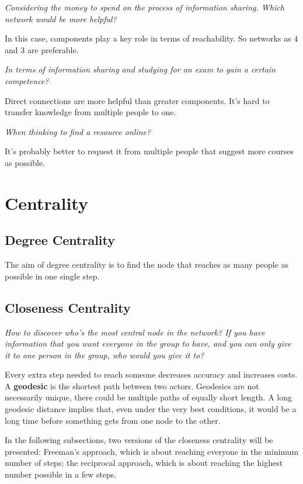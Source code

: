 \documentclass[
  notitlepage,
  onecolumn,
  openany]{book}
\begin{document}
\emph{Considering the money to spend on the process of information sharing. Which network would be more helpful?}

In this case, components play a key role in terms of reachability. So networks as \(4\) and \(3\) are preferable.

\emph{In terms of information sharing and studying for an exam to gain a certain competence?}

Direct connections are more helpful than greater components. It's hard to transfer knowledge from multiple people to one.

\emph{When thinking to find a resource online?}

It's probably better to request it from multiple people that suggest more courses as possible.

\hypertarget{centrality}{%
\chapter{Centrality}\label{centrality}}

\hypertarget{degree-centrality-1}{%
\section{Degree Centrality}\label{degree-centrality-1}}

The aim of degree centrality is to find the node that reaches as many people as possible in one single step.

\hypertarget{closeness-centrality}{%
\section{Closeness Centrality}\label{closeness-centrality}}

\emph{How to discover who's the most central node in the network? If you have information that you want everyone in the group to have, and you can only give it to one person in the group, who would you give it to?}

Every extra step needed to reach someone decreases accuracy and increases costs. A \textbf{geodesic} is the shortest path between two actors. Geodesics are not necessarily unique, there could be multiple paths of equally short length. A long geodesic distance implies that, even under the very best conditions, it would be a long time before something gets from one node to the other.

In the following subsections, two versions of the closeness centrality will be presented: Freeman's approach, which is about reaching everyone in the minimum number of steps; the reciprocal approach, which is about reaching the highest number possible in a few steps.
\end{document}
